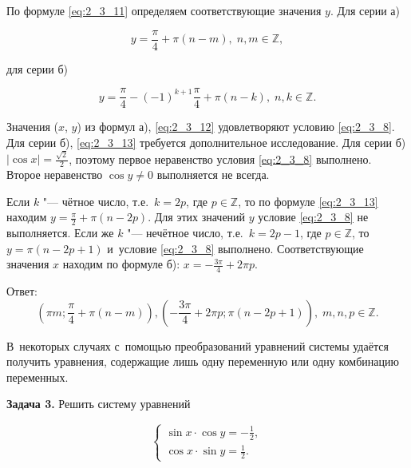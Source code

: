 По формуле \eqref{eq:2_3_11} определяем соответствующие значения $y$.
Для серии а)

\begin{equation}\label{eq:2_3_12}
\displaystyle y =  \frac{\pi}{4} + \pi(n - m), \; n, m \in \mathbb{Z},
\end{equation}

\noindent
для серии б)

\begin{equation}\label{eq:2_3_13}
\displaystyle y = \frac{\pi}{4} - (-1)^{k+1} \frac{\pi}{4} + \pi(n - k),
\; n, k \in \mathbb{Z}.
\end{equation}

Значения ($x$, $y$) из формул а), \eqref{eq:2_3_12} удовлетворяют условию
\eqref{eq:2_3_8}. Для серии б), \eqref{eq:2_3_13} требуется дополнительное
исследование. Для серии б) $\displaystyle |\cos x| = \frac{\sqrt{2}}{2}$,
поэтому первое неравенство условия \eqref{eq:2_3_8} выполнено.
Второе неравенство $\cos y \ne 0$ выполняется не всегда.

Если $k$ "--- чётное число, т.е.\ $k = 2p$, где $p \in \mathbb{Z}$,
то по формуле \eqref{eq:2_3_13} находим 
$\displaystyle y = \frac{\pi}{2} + \pi(n - 2p)$.
Для этих значений $y$ условие \eqref{eq:2_3_8} не выполняется.
Если же $k$ "--- нечётное число, т.е.\ $k = 2p - 1$, где $p \in \mathbb{Z}$,
то $y = \pi(n - 2p + 1)$ и~условие \eqref{eq:2_3_8} выполнено.
Соответствующие значения $x$ находим по формуле
б): $\displaystyle x = -\frac{3\pi}{4} + 2\pi p$.

Ответ:
\begin{equation*}
\displaystyle \left( \pi m; \frac{\pi}{4} + \pi(n - m) \right),
\displaystyle \left( -\frac{3\pi}{4} + 2\pi p; \pi(n - 2p +1) \right), \;
m, n, p \in \mathbb{Z}.
\end{equation*}

В~некоторых случаях с~помощью преобразований уравнений системы удаётся получить
уравнения, содержащие лишь одну переменную или одну комбинацию переменных.

\textbf{Задача 3.}\label{ex:2_3_3} Решить систему уравнений

\begin{equation}\label{eq:2_3_14}
\begin{cases}
\displaystyle \sin x \cdot \cos y = -\frac{1}{2}, \\[10pt]
\displaystyle \cos x \cdot \sin y = \frac{1}{2}.
\end{cases}
\end{equation}

